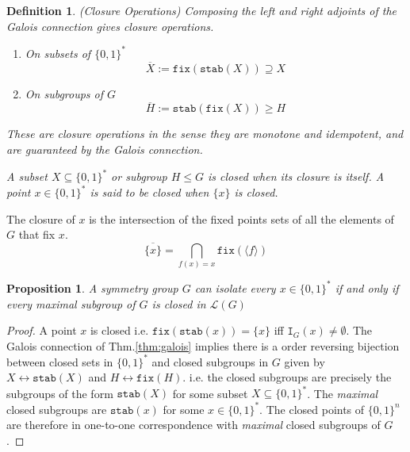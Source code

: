 \documentclass{article}
\newtheorem{proposition}[theorem]{Proposition}
\newtheorem{definition}[theorem]{Definition}
\newcommand{\bin}{\{0,1\}^*} %
\newcommand{\st}{\mathtt{stab}}
\newcommand{\I}{\mathtt{I}}
\newcommand{\fix}{\mathtt{fix}}
\begin{document}
\begin{definition} (Closure Operations)
    Composing the left and right adjoints of the Galois connection gives closure operations. 
    \begin{enumerate}
        \item On subsets of $\{0,1\}^*$
            \begin{equation}
                \overline{X} := \fix(\st(X)) \supseteq X 
            \end{equation}
        \item On subgroups of $G$
            \begin{equation}
                \overline{H} := \st(\fix(X)) \geq H
            \end{equation}
        \end{enumerate}
        These are closure operations in the sense they are monotone and idempotent, and are guaranteed by the Galois connection.

    A subset $X \subseteq \{0,1\}^*$ or subgroup $H \leq G$ is \emph{closed} when its closure is itself. A point $x \in \{0,1 \}^*$ is said to be \emph{closed} when $\{x\}$ is closed. 
    \end{definition}


The closure of $x$ is the intersection of the fixed points sets of all the elements of $G$ that fix $x$. 
\begin{equation}
    \overline{\{x\}} = \bigcap_{f(x) = x} \fix(\langle f \rangle)
\end{equation}


\begin{proposition}
    \label{prop:closed}
    A symmetry group $G$ can isolate every $x \in \bin$ if and only if every maximal subgroup of $G$ is closed in $\mathcal{L}(G)$
\end{proposition}

\begin{proof}
A point $x$ is closed i.e. $\fix(\st(x)) = \{x\}$ iff $\I_G(x) \neq \emptyset$. The Galois connection of Thm.\ref{thm:galois} implies there is a order reversing bijection between closed sets in $\{0,1\}^*$ and closed subgroups in $G$ given by $X \longleftrightarrow \st(X)$ and $H \longleftrightarrow \fix(H)$. i.e. the closed subgroups are precisely the subgroups of the form $\st(X)$ for some subset $X \subseteq \bin$. The \emph{maximal} closed subgroups are $\st(x)$ for some $x \in \bin$. The closed points of $\{0,1\}^n$ are therefore in one-to-one correspondence with \emph{maximal} closed subgroups of $G$. 
\end{proof}
\end{document}
